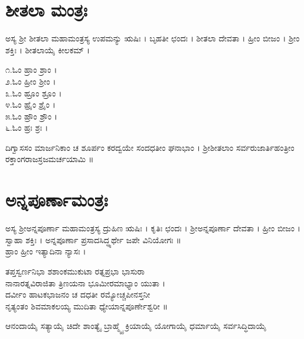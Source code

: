 

\section{ಶೀತಲಾ ಮಂತ್ರಃ}
ಅಸ್ಯ ಶ್ರೀ ಶೀತಲಾ ಮಹಾಮಂತ್ರಸ್ಯ ಉಪಮನ್ಯು ಋಷಿಃ  ।  ಬೃಹತೀ ಛಂದಃ । ಶೀತಲಾ ದೇವತಾ । ಹ್ರೀಂ ಬೀಜಂ । ಶ್ರೀಂ ಶಕ್ತಿಃ । ಶೀತಲಾಯೈ ಕೀಲಕಮ್ ।

೧.ಓಂ ಹ್ರಾಂ ಶ್ರಾಂ ।\\ 
೨.ಓಂ ಹ್ರೀಂ ಶ್ರೀಂ ।\\
೩.ಓಂ ಹ್ರೂಂ ಶ್ರೂಂ ।\\ 
೪.ಓಂ ಹ್ರೈಂ ಶ್ರೈಂ  ।\\
೫.ಓಂ ಹ್ರೌಂ ಶ್ರೌಂ ।\\
೬.ಓಂ ಹ್ರಃ ಶ್ರಃ ।

ದಿಗ್ವಾಸಸಂ ಮಾರ್ಜನಿಕಾಂ ಚ ಶೂರ್ಪಂ ಕರದ್ವಯೇ ಸಂದಧತೀಂ ಘನಾಭಾಂ ।
ಶ್ರೀಶೀತಲಾಂ ಸರ್ವರುಜಾರ್ತಿಹಂತ್ರೀಂ ರಕ್ತಾಂಗರಾಜಸ್ರಜಮರ್ಚಯಾಮಿ ॥

 \newpage
\section{ಅನ್ನಪೂರ್ಣಾಮಂತ್ರಃ}
ಅಸ್ಯ ಶ್ರೀಅನ್ನಪೂರ್ಣಾ ಮಹಾಮಂತ್ರಸ್ಯ ದ್ರುಹಿಣ ಋಷಿಃ  ।  ಕೃತಿಃ ಛಂದಃ ।  ಶ್ರೀಅನ್ನಪೂರ್ಣಾ ದೇವತಾ । ಹ್ರೀಂ ಬೀಜಂ । ಸ್ವಾಹಾ  ಶಕ್ತಿಃ । ಅನ್ನಪೂರ್ಣಾ ಪ್ರಸಾದಸಿದ್ಧ್ಯರ್ಥೇ ಜಪೇ ವಿನಿಯೋಗಃ ॥\\
ಹ್ರಾಂ ಹ್ರೀಂ ಇತ್ಯಾದಿನಾ ನ್ಯಾಸಃ ।

ತಪ್ತಸ್ವರ್ಣನಿಭಾ ಶಶಾಂಕಮುಕುಟಾ ರತ್ನಪ್ರಭಾ ಭಾಸುರಾ\\ನಾನಾರತ್ನವಿರಾಜಿತಾ ತ್ರಿಣಯನಾ ಭೂಮೀರಮಾಭ್ಯಾಂ ಯುತಾ ।\\
ದರ್ವೀಂ ಹಾಟಕಭಾಜನಂ ಚ ದಧತೀ ರಮ್ಯೋಚ್ಚಪೀನಸ್ತನೀ\\ನೃತ್ಯಂತಂ ಶಿವಮಾಕಲಯ್ಯ ಮುದಿತಾ ಧ್ಯೇಯಾನ್ನಪೂರ್ಣೇಶ್ವರೀ ॥


ಆನಂದಾಯೈ ಸತ್ಯಾಯೈ ಚಿದೇ ಶಾಂತ್ಯೈ ಬ್ರಾಹ್ಮ್ಯೈ ಕ್ರಿಯಾಯೈ ಯೋಗಾಯೈ ಧರ್ಮಾಯೈ ಸರ್ವಸಿದ್ಧಿದಾಯೈ 



